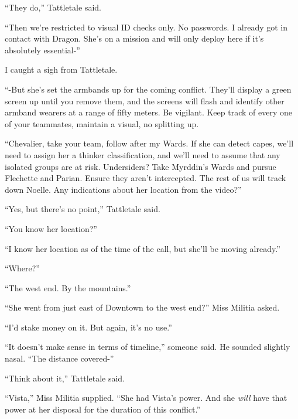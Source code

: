 ``They do,'' Tattletale said.



``Then we're restricted to visual ID checks only.  No passwords.  I already got in contact with Dragon.  She's on a mission and will only deploy here if it's absolutely essential-''



I caught a sigh from Tattletale.



``-But she's set the armbands up for the coming conflict.  They'll display a green screen up until you remove them, and the screens will flash and identify other armband wearers at a range of fifty meters.  Be vigilant.  Keep track of every one of your teammates, maintain a visual, no splitting up.



``Chevalier, take your team, follow after my Wards.  If she can detect capes, we'll need to assign her a thinker classification, and we'll need to assume that any isolated groups are at risk.  Undersiders?  Take Myrddin's Wards and pursue Flechette and Parian.  Ensure they aren't intercepted.  The rest of us will track down Noelle.  Any indications about her location from the video?''



``Yes, but there's no point,'' Tattletale said.



``You know her location?''



``I know her location as of the time of the call, but she'll be moving already.''



``Where?''



``The west end.  By the mountains.''



``She went from just east of Downtown to the west end?'' Miss Militia asked.



``I'd stake money on it.  But again, it's no use.''



``It doesn't make sense in terms of timeline,'' someone said.  He sounded slightly nasal.  ``The distance covered-''



``Think about it,'' Tattletale said.



``Vista,'' Miss Militia supplied.  ``She had Vista's power.  And she \emph{will} have that power at her disposal for the duration of this conflict.''



